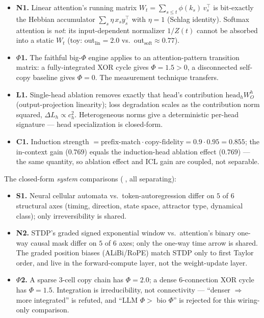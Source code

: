 \documentclass[11pt,a4paper]{article}
\providecommand{\tierBlue}{🔵}
\begin{document}
\begin{itemize}\itemsep0.3em
\item \textbf{N1.} Linear attention's running matrix
  $W_t=\sum_{s\le t}\phi(k_s)\,v_s^{\!\top}$ is bit-exactly the Hebbian
  accumulator $\sum_s \eta\,x_s y_s^{\!\top}$ with $\eta{=}1$ (Schlag
  identity). Softmax attention is \emph{not}: its input-dependent
  normalizer $1/Z(t)$ cannot be absorbed into a static $W_t$
  (toy: out$_{\text{lin}}{=}2.0$ vs.\ out$_{\text{soft}}{\approx}0.77$).
\item \textbf{$\Phi$1.} The faithful big-$\Phi$ engine applies to an
  attention-pattern transition matrix: a fully-integrated XOR cycle
  gives $\Phi{=}1.5>0$, a disconnected self-copy baseline gives
  $\Phi{=}0$. The measurement technique transfers.
\item \textbf{L1.} Single-head ablation removes exactly that head's
  contribution $\mathrm{head}_h W_O^h$ (output-projection linearity);
  loss degradation scales as the contribution norm squared,
  $\Delta L_h\propto c_h^2$. Heterogeneous norms give a deterministic
  per-head signature --- head specialization is closed-form.
\item \textbf{C1.} Induction strength
  $=\text{prefix-match}\cdot\text{copy-fidelity}=0.9{\cdot}0.95=0.855$;
  the in-context gain ($0.769$) equals the induction-head ablation
  effect ($0.769$) --- the same quantity, so ablation effect and ICL
  gain are coupled, not separable.
\end{itemize}

The closed-form \emph{system} comparisons ($\tierBlue$, all separating):

\begin{itemize}\itemsep0.3em
\item \textbf{S1.} Neural cellular automata vs.\ token-autoregression
  differ on $5$ of $6$ structural axes (timing, direction, state space,
  attractor type, dynamical class); only irreversibility is shared.
\item \textbf{N2.} STDP's graded signed exponential window vs.\
  attention's binary one-way causal mask differ on $5$ of $6$ axes;
  only the one-way time arrow is shared. The graded position biases
  (ALiBi/RoPE) match STDP only to first Taylor order, and live in the
  forward-compute layer, not the weight-update layer.
\item \textbf{$\Phi$2.} A sparse $3$-cell copy chain has $\Phi=2.0$; a
  dense $6$-connection XOR cycle has $\Phi=1.5$. Integration is
  irreducibility, not connectivity --- ``denser $\Rightarrow$ more
  integrated'' is refuted, and ``LLM $\Phi >$ bio $\Phi$'' is rejected
  for this wiring-only comparison.
\end{itemize}
\end{document}
